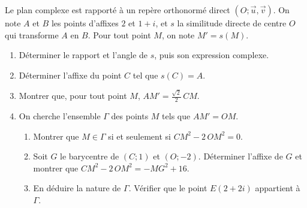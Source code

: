 \begin{exo}\label{exo:sim-apollonius}
      Le plan complexe est rapporté à un repère orthonormé direct $(O;\vec{u},\vec{v})$.
      On note $A$ et $B$ les points d'affixes $2$ et $1 + i$, et $s$ la similitude directe de centre $O$ qui transforme $A$ en $B$.
      Pour tout point $M$, on note $M' = s(M)$.
      \begin{enumerate}
            \item Déterminer le rapport et l'angle de $s$, puis son expression complexe.
            \item Déterminer l'affixe du point $C$ tel que $s(C) = A$.
            \item Montrer que, pour tout point $M$, $AM' = \frac{\sqrt{2}}{2}\, CM$.
            \item On cherche l'ensemble $\Gamma$ des points $M$ tels que $AM' = OM$.
                  \begin{enumerate}
                        \item Montrer que $M \in \Gamma$ si et seulement si $CM^2 - 2\,OM^2 = 0$.
                        \item Soit $G$ le barycentre de $(C;1)$ et $(O;-2)$. Déterminer l'affixe de $G$ et montrer que
                              $CM^2 - 2\,OM^2 = -MG^2 + 16$.
                        \item En déduire la nature de $\Gamma$. Vérifier que le point $E(2 + 2i)$ appartient à $\Gamma$.
                  \end{enumerate}
      \end{enumerate}
\end{exo}
